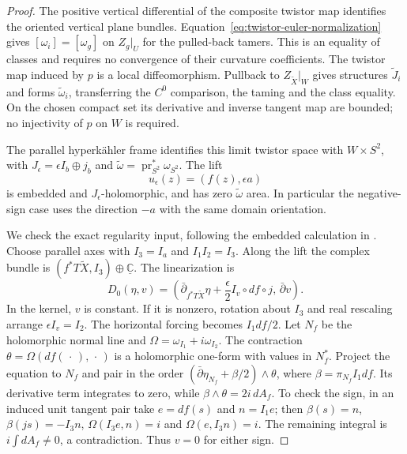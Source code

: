 \documentclass[11pt]{article}
\numberwithin{equation}{section}
\theoremstyle{definition}
\theoremstyle{remark}
\begin{document}
\begin{proof}
The positive vertical differential of the composite twistor
map identifies the oriented vertical plane bundles.
Equation~\eqref{eq:twistor-euler-normalization} gives
$[\omega_i]=[\omega_g]$ on $Z_g|_U$ for the pulled-back tamers.
This is an equality of classes and requires no convergence
of their curvature coefficients.
The twistor map induced by $p$ is a local diffeomorphism.
Pullback to $Z_{\widetilde X}|_W$ gives structures
$\widetilde J_i$ and forms $\widetilde\omega_i$, transferring
the $C^0$ comparison, the taming and the class equality.
On the chosen compact set
its derivative and inverse tangent map are bounded; no
injectivity of $p$ on $W$ is required.

The parallel hyperk\"ahler frame identifies this limit twistor
space with $W\times S^2$, with
$J_\epsilon=\epsilon I_b\oplus j_b$ and
$\widetilde\omega=\operatorname{pr}_{S^2}^*\omega_{S^2}$.
The lift
\[
 u_\epsilon(z)=(f(z),\epsilon a)
\]
is embedded and $J_\epsilon$-holomorphic, and has zero
$\widetilde\omega$ area. In particular the negative-sign
case uses the direction $-a$ with the same domain orientation.

We check the exact regularity input, following the embedded
calculation in \cite[Proposition~8 and Corollary~9]{Fine2017TwistorLimits}.
Choose parallel axes with $I_3=I_a$ and $I_1I_2=I_3$.
Along the lift the complex bundle is
$(f^*T\widetilde X,I_3)\oplus\underline{\mathbb C}$.
The linearization is
\[
 D_0(\eta,v)=
 \left(\bar\partial_{f^*T\widetilde X}\eta+
           \frac{\epsilon}{2}I_v\circ df\circ j,\,
       \bar\partial v\right).
\]
In the kernel, $v$ is constant. If it is nonzero, rotation
about $I_3$ and real rescaling arrange $\epsilon I_v=I_2$.
The horizontal forcing becomes $I_1df/2$.
Let $N_f$ be the holomorphic normal line and
$\Omega=\omega_{I_1}+i\omega_{I_2}$. The contraction
$\theta=\Omega(df(\,\cdot\,),\,\cdot\,)$ is a holomorphic
one-form with values in $N_f^*$. Project the equation to
$N_f$ and pair in the order
$(\bar\partial\eta_{N_f}+\beta/2)\wedge\theta$,
where $\beta=\pi_{N_f}I_1df$.
Its derivative term integrates to zero, while
$\beta\wedge\theta=2i\,dA_f$. To check the sign, in an
induced unit tangent pair take $e=df(s)$ and $n=I_1e$;
then $\beta(s)=n$, $\beta(js)=-I_3n$,
$\Omega(I_3e,n)=i$ and $\Omega(e,I_3n)=i$.
The remaining integral is $i\int dA_f\ne0$, a contradiction.
Thus $v=0$ for either sign.


\end{proof}
\end{document}
